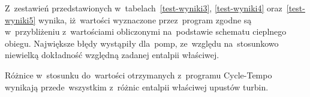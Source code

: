 Z~zestawień przedstawionych w~tabelach~\ref{test-wyniki3},
\ref{test-wyniki4} oraz~\ref{test-wyniki5} wynika, iż~wartości
wyznaczone przez~program zgodne są w~przybliżeniu z~wartościami
obliczonymi na~podstawie schematu cieplnego obiegu. Największe błędy
wystąpiły dla~pomp, ze~względu na~stosunkowo niewielką dokładność
względną zadanej entalpii właściwej.

Różnice w~stosunku do~wartości otrzymanych z~programu Cycle-Tempo
wynikają przede~wszystkim z~różnic entalpii właściwej upustów turbin.


